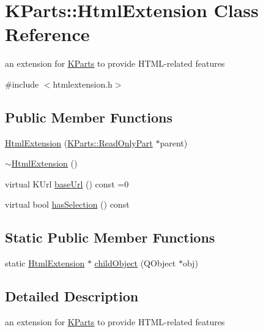 \hypertarget{classKParts_1_1HtmlExtension}{\section{\-K\-Parts\-:\-:\-Html\-Extension \-Class \-Reference}
\label{classKParts_1_1HtmlExtension}
}


an extension for \hyperlink{namespaceKParts}{\-K\-Parts} to provide \-H\-T\-M\-L-\/related features  




{\ttfamily \#include $<$htmlextension.\-h$>$}

\subsection*{\-Public \-Member \-Functions}
\begin{DoxyCompactItemize}
\item 
\hyperlink{classKParts_1_1HtmlExtension_ab75dcddad99744aad01a10b9b46b4f61}{\-Html\-Extension} (\hyperlink{classKParts_1_1ReadOnlyPart}{\-K\-Parts\-::\-Read\-Only\-Part} $\ast$parent)
\item 
\hyperlink{classKParts_1_1HtmlExtension_a090a296e890f968563d0352d4836efdd}{$\sim$\-Html\-Extension} ()
\item 
virtual \-K\-Url \hyperlink{classKParts_1_1HtmlExtension_a4be55820c257361f38ad9a595048bf5e}{base\-Url} () const =0
\item 
virtual bool \hyperlink{classKParts_1_1HtmlExtension_af3fe68c816bf92e14ceafdbf5179f134}{has\-Selection} () const 
\end{DoxyCompactItemize}
\subsection*{\-Static \-Public \-Member \-Functions}
\begin{DoxyCompactItemize}
\item 
static \hyperlink{classKParts_1_1HtmlExtension}{\-Html\-Extension} $\ast$ \hyperlink{classKParts_1_1HtmlExtension_a1008467fb117fa5dcf7cba422aa91f68}{child\-Object} (\-Q\-Object $\ast$obj)
\end{DoxyCompactItemize}


\subsection{\-Detailed \-Description}
an extension for \hyperlink{namespaceKParts}{\-K\-Parts} to provide \-H\-T\-M\-L-\/related features 

